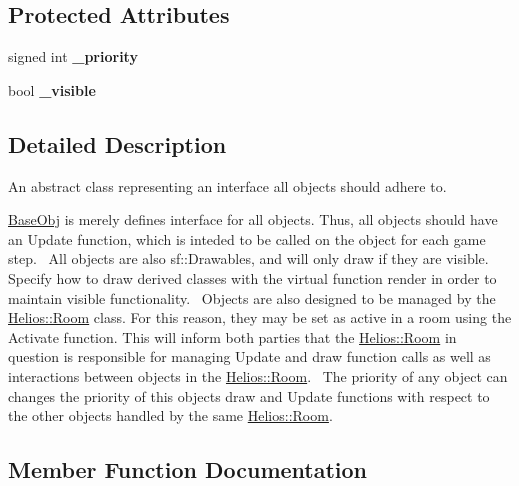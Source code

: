 \subsection*{Protected Attributes}
\begin{DoxyCompactItemize}
\item 
\hypertarget{class_helios_1_1_base_obj_aad807d0a4296ffdfddf2e653b428481a}{}signed int {\bfseries \+\_\+priority}\label{class_helios_1_1_base_obj_aad807d0a4296ffdfddf2e653b428481a}

\item 
\hypertarget{class_helios_1_1_base_obj_aed78a9a68c038e6d82e07711f9065e33}{}bool {\bfseries \+\_\+visible}\label{class_helios_1_1_base_obj_aed78a9a68c038e6d82e07711f9065e33}

\end{DoxyCompactItemize}


\subsection{Detailed Description}
An abstract class representing an interface all objects should adhere to. 

\hyperlink{class_helios_1_1_base_obj}{Base\+Obj} is merely defines interface for all objects. Thus, all objects should have an Update function, which is inteded to be called on the object for each game step.~\newline
 All objects are also sf\+::\+Drawables, and will only draw if they are visible. Specify how to draw derived classes with the virtual function render in order to maintain visible functionality.~\newline
 Objects are also designed to be managed by the \hyperlink{class_helios_1_1_room}{Helios\+::\+Room} class. For this reason, they may be set as active in a room using the Activate function. This will inform both parties that the \hyperlink{class_helios_1_1_room}{Helios\+::\+Room} in question is responsible for managing Update and draw function calls as well as interactions between objects in the \hyperlink{class_helios_1_1_room}{Helios\+::\+Room}.~\newline
 The priority of any object can changes the priority of this object\textquotesingle{}s draw and Update functions with respect to the other objects handled by the same \hyperlink{class_helios_1_1_room}{Helios\+::\+Room}.~\newline


\subsection{Member Function Documentation}
\hypertarget{class_helios_1_1_base_obj_a7823cb052c6c97f4aab120f6eb864392}{}
